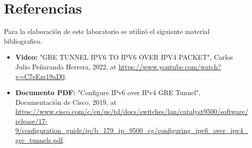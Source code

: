 \documentclass[a4paper,12pt]{article}
\begin{document}
\section{Referencias}
Para la elaboración de este laboratorio se utilizó el siguiente material bibliografico.
\begin{itemize}
    \item \textbf{Video:} "GRE TUNNEL IPV6 TO IPV6 OVER IPV4 PACKET", Carlos Julio Peñaranda Herrera, 2022, at \url{https://www.youtube.com/watch?v=C7eEzr19aD0}.
    \item \textbf{Documento PDF:} "Configure IPv6 over IPv4 GRE Tunnel", Documentación de Cisco, 2019, at \url{https://www.cisco.com/c/en/us/td/docs/switches/lan/catalyst9500/software/release/17-9/configuration_guide/ip/b_179_ip_9500_cg/configuring_ipv6_over_ipv4_gre_tunnels.pdf}.
\end{itemize}
\end{document}
